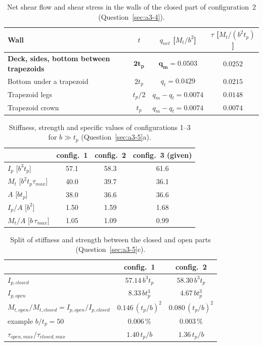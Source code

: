 \begin{table}[H]
  \centering
  \caption{Net shear flow and shear stress in the walls of the closed part of configuration~2 (Question~\ref{sec:a3-4}).}
  \label{tab:a3-walls}
  \small
  \begin{tabular}{lccc}
    \toprule
    Wall & $t$ & $q_{net}$ [$M_t/b^2$] & $\tau$ [$M_t/(b^2t_p)$] \\
    \midrule
    \textbf{Deck, sides, bottom between trapezoids} & $\boldsymbol{2t_p}$ & $\boldsymbol{q_m = 0.0503}$ & $\boldsymbol{0.0252}$ \\
    Bottom under a trapezoid                & $2t_p$   & $q_t = 0.0429$     & $0.0215$ \\
    Trapezoid legs                          & $t_p/2$  & $q_m-q_t = 0.0074$ & $0.0148$ \\
    Trapezoid crown                         & $t_p$    & $q_m-q_t = 0.0074$ & $0.0074$ \\
    \bottomrule
  \end{tabular}
\end{table}

\begin{table}[H]
  \centering
  \caption{Stiffness, strength and specific values of configurations 1--3 for $b\gg t_p$ (Question~\ref{sec:a3-5}a).}
  \label{tab:a3-specific}
  \small
  \begin{tabular}{lccc}
    \toprule
     & config.\ 1 & config.\ 2 & config.\ 3 (given) \\
    \midrule
    $I_p$ [$b^3t_p$]                    & 57.1  & 58.3  & 61.6 \\
    $M_t$ [$b^2t_p\tau_{max}$]          & 40.0  & 39.7  & 36.1 \\
    $A$ [$bt_p$]                        & 38.0  & 36.6  & 36.6 \\
    $I_p/A$ [$b^2$]                     & 1.50  & 1.59  & 1.68 \\
    $M_t/A$ [$b\,\tau_{max}$]           & 1.05  & 1.09  & 0.99 \\
    \bottomrule
  \end{tabular}
\end{table}

\begin{table}[H]
  \centering
  \caption{Split of stiffness and strength between the closed and open parts (Question~\ref{sec:a3-5}c).}
  \label{tab:a3-openclosed}
  \small
  \begin{tabular}{lcc}
    \toprule
     & config.\ 1 & config.\ 2 \\
    \midrule
    $I_{p,closed}$ & $57.14\,b^3t_p$ & $58.30\,b^3t_p$ \\
    $I_{p,open}$   & $8.33\,bt_p^3$  & $4.67\,bt_p^3$ \\
    $M_{t,open}/M_{t,closed} = I_{p,open}/I_{p,closed}$ & $0.146\,(t_p/b)^2$ & $0.080\,(t_p/b)^2$ \\
    example $b/t_p = 50$ & $0.006\,\%$ & $0.003\,\%$ \\
    $\tau_{open,max}/\tau_{closed,max}$ & $1.40\,t_p/b$ & $1.36\,t_p/b$ \\
    \bottomrule
  \end{tabular}
\end{table}
